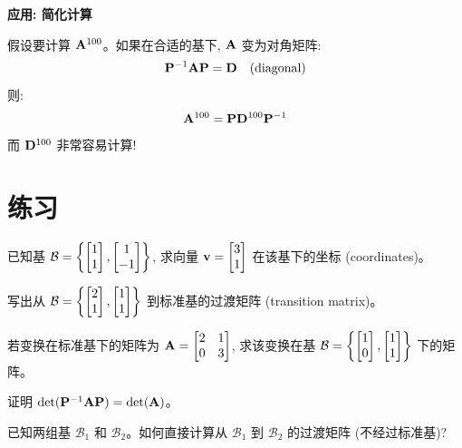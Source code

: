 \begin{practical}
\textbf{应用: 简化计算}

假设要计算 $\mathbf{A}^{100}$。如果在合适的基下, $\mathbf{A}$ 变为对角矩阵:
\[
\mathbf{P}^{-1} \mathbf{A} \mathbf{P} = \mathbf{D} \quad \text{(diagonal)}
\]
则:
\[
\mathbf{A}^{100} = \mathbf{P} \mathbf{D}^{100} \mathbf{P}^{-1}
\]
而 $\mathbf{D}^{100}$ 非常容易计算!
\end{practical}

\section{练习}

\begin{exercise}
已知基 $\mathcal{B} = \left\{ \begin{bmatrix} 1 \\ 1 \end{bmatrix}, \begin{bmatrix} 1 \\ -1 \end{bmatrix} \right\}$, 求向量 $\mathbf{v} = \begin{bmatrix} 3 \\ 1 \end{bmatrix}$ 在该基下的坐标 (coordinates)。
\end{exercise}

\begin{exercise}
写出从 $\mathcal{B} = \left\{ \begin{bmatrix} 2 \\ 1 \end{bmatrix}, \begin{bmatrix} 1 \\ 1 \end{bmatrix} \right\}$ 到标准基的过渡矩阵 (transition matrix)。
\end{exercise}

\begin{exercise}
若变换在标准基下的矩阵为 $\mathbf{A} = \begin{bmatrix} 2 & 1 \\ 0 & 3 \end{bmatrix}$, 求该变换在基 $\mathcal{B} = \left\{ \begin{bmatrix} 1 \\ 0 \end{bmatrix}, \begin{bmatrix} 1 \\ 1 \end{bmatrix} \right\}$ 下的矩阵。
\end{exercise}

\begin{exercise}[挑战]
证明 $\det(\mathbf{P}^{-1}\mathbf{A}\mathbf{P}) = \det(\mathbf{A})$。
\end{exercise}

\begin{problem}
已知两组基 $\mathcal{B}_1$ 和 $\mathcal{B}_2$。如何直接计算从 $\mathcal{B}_1$ 到 $\mathcal{B}_2$ 的过渡矩阵 (不经过标准基)?
\end{problem}

